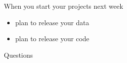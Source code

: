 \documentclass[aspectratio=169]{beamer}
\begin{document}
\begin{frame}

When you start your projects next week
\begin{itemize}
\item plan to release your data
\item plan to release your code
\end{itemize}

\end{frame}
\begin{frame}

\begin{center}
\LARGE Questions
\end{center}

\end{frame}
\end{document}
